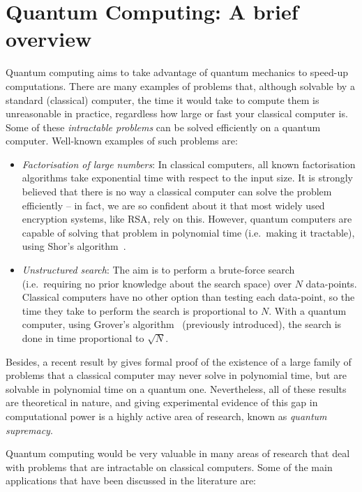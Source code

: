 \chapter{Quantum Computing: A brief overview}

Quantum computing aims to take advantage of quantum mechanics to speed-up computations. There are many examples of problems that, although solvable by a standard (classical) computer, the time it would take to compute them is unreasonable in practice, regardless how large or fast your classical computer is. Some of these \textit{intractable problems} can be solved efficiently on a quantum computer. Well-known examples of such problems are:

\begin{itemize} 
\item \textit{Factorisation of large numbers}: In classical computers, all known factorisation algorithms take exponential time with respect to the input size. It is strongly believed that there is no way a classical computer can solve the problem efficiently -- in fact, we are so confident about it that most widely used encryption systems, like RSA, rely on this. However, quantum computers are capable of solving that problem in polynomial time (i.e.\ making it tractable), using Shor's algorithm~\citep{Shor}.
\item \textit{Unstructured search}: The aim is to perform a brute-force search (i.e.\ requiring no prior knowledge about the search space) over \(N\) data-points. Classical computers have no other option than testing each data-point, so the time they take to perform the search is proportional to \(N\). With a quantum computer, using Grover's algorithm~\citep{Grover} (previously introduced), the search is done in time proportional to \(\sqrt{N}\).
\end{itemize}

Besides, a recent result by \citet{BQPSepPH} gives formal proof of the existence of a large family of problems that a classical computer may never solve in polynomial time, but are solvable in polynomial time on a quantum one. Nevertheless, all of these results are theoretical in nature, and giving experimental evidence of this gap in computational power is a highly active area of research, known as \textit{quantum supremacy}. 

Quantum computing would be very valuable in many areas of research that deal with problems that are intractable on classical computers. Some of the main applications that have been discussed in the literature are:

